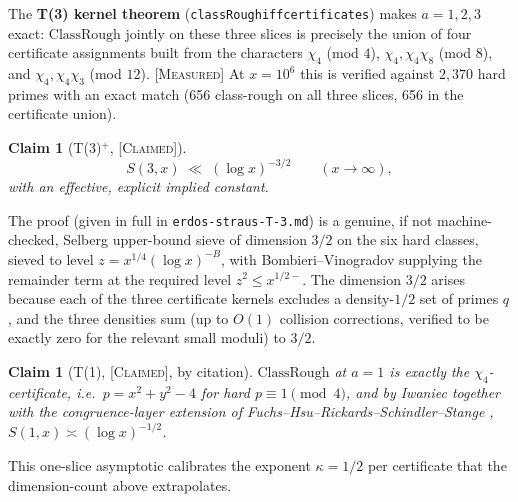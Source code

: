 \documentclass[11pt]{article}
\theoremstyle{plain}
\newtheorem{claimstmt}[theorem]{Claim}
\theoremstyle{definition}
\theoremstyle{remark}
\newcommand{\CLAIMED}{\textcolor{claimed}{\textsc{[Claimed]}}}
\newcommand{\MEASURED}{\textcolor{claimed}{\textsc{[Measured]}}}
\newcommand{\file}[1]{\texttt{#1}}
\newcommand{\lean}[1]{\texttt{#1}}
\renewcommand{\_}{\textunderscore\allowbreak}
\begin{document}
The \textbf{T(3) kernel theorem} (\lean{classRough\_123\_iff\_certificates}) makes $a=1,2,3$
exact: $\mathrm{ClassRough}$ jointly on these three slices is precisely the union of four
certificate assignments built from the characters $\chi_4$ (mod $4$), $\chi_4,\chi_4\chi_8$
(mod $8$), and $\chi_4,\chi_4\chi_3$ (mod $12$). \MEASURED{} At $x=10^6$ this is verified against
$2{,}370$ hard primes with an exact match (656 class-rough on all three slices, 656 in the
certificate union).

\begin{claimstmt}[T(3)$^+$, \CLAIMED] \label{claim:t3plus}
\[
S(3,x) \;\ll\; (\log x)^{-3/2} \qquad (x\to\infty),
\]
with an effective, explicit implied constant.
\end{claimstmt}
The proof (given in full in \file{erdos-straus-T-3.md}) is a genuine, if not machine-checked,
Selberg upper-bound sieve of dimension $3/2$ on the six hard classes, sieved to level
$z=x^{1/4}(\log x)^{-B}$, with Bombieri--Vinogradov supplying the remainder term at the required
level $z^2\le x^{1/2-}$. The dimension $3/2$ arises because each of the three certificate
kernels excludes a density-$1/2$ set of primes $q$, and the three densities sum (up to $O(1)$
collision corrections, verified to be exactly zero for the relevant small moduli) to $3/2$.
\begin{claimstmt}[T(1), \CLAIMED, by citation]
$\mathrm{ClassRough}$ at $a=1$ is exactly the $\chi_4$-certificate, i.e.\ $p=x^2+y^2-4$ for hard
$p\equiv1\pmod4$, and by Iwaniec \cite{Iwaniec1974} together with the congruence-layer extension
of Fuchs--Hsu--Rickards--Schindler--Stange \cite{FHRSS2025}, $S(1,x)\asymp(\log x)^{-1/2}$.
\end{claimstmt}
This one-slice asymptotic calibrates the exponent $\kappa=1/2$ per certificate that the
dimension-count above extrapolates.
\end{document}
